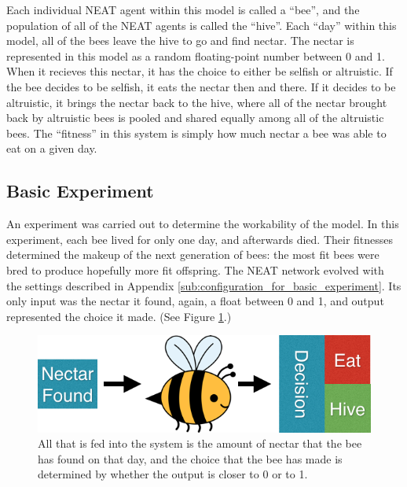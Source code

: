 \documentclass[11pt]{article}
\begin{document}
			Each individual NEAT agent within this model is called a ``bee'', and the population of all of the NEAT agents is called the ``hive''. Each ``day'' within this model, all of the bees leave the hive to go and find nectar. The nectar is represented in this model as a random floating-point number between 0 and 1. When it recieves this nectar, it has the choice to either be selfish or altruistic. If the bee decides to be selfish, it eats the nectar then and there. If it decides to be altruistic, it brings the nectar back to the hive, where all of the nectar brought back by altruistic bees is pooled and shared equally among all of the altruistic bees. The ``fitness'' in this system is simply how much nectar a bee was able to eat on a given day.

		\subsection{Basic Experiment} %
		\label{sub:basic_experiment}
			An experiment was carried out to determine the workability of the model. In this experiment, each bee lived for only one day, and afterwards died. Their fitnesses determined the makeup of the next generation of bees: the most fit bees were bred to produce hopefully more fit offspring. The NEAT network evolved with the settings described in Appendix \ref{sub:configuration_for_basic_experiment}. Its only input was the nectar it found, again, a float between 0 and 1, and output represented the choice it made. (See Figure \ref{fig:naive_system}.)

			\begin{figure}[tb]
				\begin{center}
					\includegraphics[scale=.5]{bee_diagrams/naive_system.png}
				\end{center}
				\caption{All that is fed into the system is the amount of nectar that the bee has found on that day, and the choice that the bee has made is determined by whether the output is closer to 0 or to 1.}
				\label{fig:naive_system}
			\end{figure}
\end{document}
